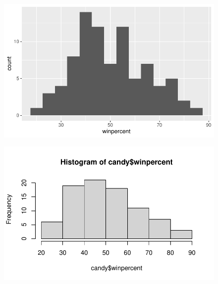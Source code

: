 \documentclass[
  letterpaper,
  DIV=11,
  numbers=noendperiod]{scrartcl}
\newenvironment{Shaded}{\begin{snugshade}}{\end{snugshade}}
\newcommand{\AttributeTok}[1]{\textcolor[rgb]{0.40,0.45,0.13}{#1}}
\newcommand{\DecValTok}[1]{\textcolor[rgb]{0.68,0.00,0.00}{#1}}
\newcommand{\FunctionTok}[1]{\textcolor[rgb]{0.28,0.35,0.67}{#1}}
\newcommand{\NormalTok}[1]{\textcolor[rgb]{0.00,0.23,0.31}{#1}}
\newcommand{\SpecialCharTok}[1]{\textcolor[rgb]{0.37,0.37,0.37}{#1}}
\begin{document}
\begin{figure}[H]

{\centering \includegraphics{Class-9_files/figure-pdf/unnamed-chunk-11-1.pdf}

}

\end{figure}

\begin{Shaded}
\end{Shaded}

\begin{figure}[H]

{\centering \includegraphics{Class-9_files/figure-pdf/unnamed-chunk-12-1.pdf}

}

\end{figure}
\end{document}

